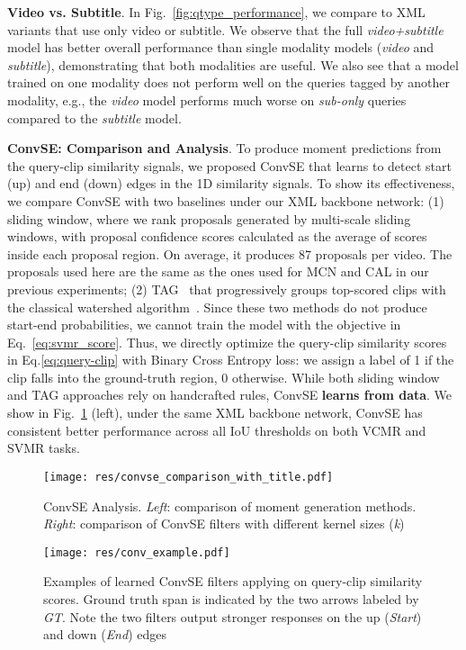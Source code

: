 \documentclass[runningheads]{llncs}
\begin{document}
\noindent\textbf{Video vs. Subtitle}.
In Fig.~\ref{fig:qtype_performance}, we compare to XML variants that use only video or subtitle. 
We observe that the full \textit{video+subtitle} model has better overall performance than single modality models (\textit{video} and \textit{subtitle}), demonstrating that both modalities are useful. 
We also see that a model trained on one modality does not perform well on the queries tagged by another modality, e.g., the \textit{video} model performs much worse on \textit{sub-only} queries compared to the \textit{subtitle} model. 

\kern1mm
\noindent\textbf{ConvSE: Comparison and Analysis}. 
To produce moment predictions from the query-clip similarity signals, we proposed ConvSE that learns to detect start (up) and end (down) edges in the 1D similarity signals. 
To show its effectiveness, we compare ConvSE with two baselines under our XML backbone network: (1) sliding window, where we rank proposals generated by multi-scale sliding windows, with proposal confidence scores calculated as the average of scores inside each proposal region. On average, it produces 87 proposals per video. The proposals used here are the same as the ones used for MCN and CAL in our previous experiments; (2) TAG~\cite{zhao2017temporal} that progressively groups top-scored clips with the classical watershed algorithm~\cite{roerdink2000watershed}. 
Since these two methods do not produce start-end probabilities, we cannot train the model with the objective in Eq.~\ref{eq:svmr_score}. 
Thus, we directly optimize the query-clip similarity scores in Eq.\ref{eq:query-clip} with Binary Cross Entropy loss: we assign a label of 1 if the clip falls into the ground-truth region, 0 otherwise.
While both sliding window and TAG approaches rely on handcrafted rules, ConvSE \textbf{learns from data}. 
We show in Fig.~\ref{fig:convse_comparison} (left), under the same XML backbone network, ConvSE has consistent better performance across all IoU thresholds on both VCMR and SVMR tasks. 


\begin{figure}[!t]
  \centering
  \texttt{[image: res/convse\_comparison\_with\_title.pdf]}
  \caption{ConvSE Analysis. \textit{Left}: comparison of moment generation methods. \textit{Right}: comparison of ConvSE filters with different kernel sizes (\textit{k})}
  \label{fig:convse_comparison}
\end{figure}



\begin{figure}[!t]
  \centering
  \texttt{[image: res/conv\_example.pdf]}
  \caption{Examples of learned ConvSE filters applying on query-clip similarity scores. Ground truth span is indicated by the two arrows  labeled by \textit{GT}. Note the two filters output stronger responses on the up (\textit{Start}) and down (\textit{End}) edges}
  \label{fig:conv_example}
\end{figure}
\end{document}
